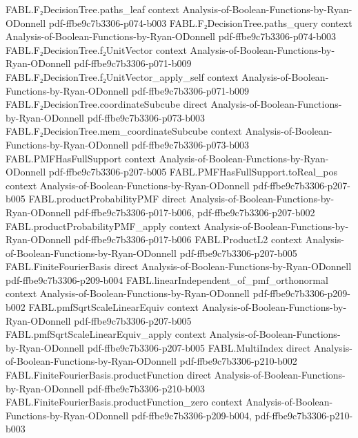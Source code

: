 \begin{theorem}
  {FABL.F₂DecisionTree.paths_leaf}
  {context}
  {Analysis-of-Boolean-Functions-by-Ryan-ODonnell}
  {pdf-ffbe9c7b3306-p074-b003}
\proofstep
  {FABL.F₂DecisionTree.paths_query}
  {context}
  {Analysis-of-Boolean-Functions-by-Ryan-ODonnell}
  {pdf-ffbe9c7b3306-p074-b003}
\proofstep
  {FABL.F₂DecisionTree.f₂UnitVector}
  {context}
  {Analysis-of-Boolean-Functions-by-Ryan-ODonnell}
  {pdf-ffbe9c7b3306-p071-b009}
\proofstep
  {FABL.F₂DecisionTree.f₂UnitVector_apply_self}
  {context}
  {Analysis-of-Boolean-Functions-by-Ryan-ODonnell}
  {pdf-ffbe9c7b3306-p071-b009}
\proofstep
  {FABL.F₂DecisionTree.coordinateSubcube}
  {direct}
  {Analysis-of-Boolean-Functions-by-Ryan-ODonnell}
  {pdf-ffbe9c7b3306-p073-b003}
\proofstep
  {FABL.F₂DecisionTree.mem_coordinateSubcube}
  {context}
  {Analysis-of-Boolean-Functions-by-Ryan-ODonnell}
  {pdf-ffbe9c7b3306-p073-b003}
\proofstep
  {FABL.PMFHasFullSupport}
  {context}
  {Analysis-of-Boolean-Functions-by-Ryan-ODonnell}
  {pdf-ffbe9c7b3306-p207-b005}
\proofstep
  {FABL.PMFHasFullSupport.toReal_pos}
  {context}
  {Analysis-of-Boolean-Functions-by-Ryan-ODonnell}
  {pdf-ffbe9c7b3306-p207-b005}
\proofstep
  {FABL.productProbabilityPMF}
  {direct}
  {Analysis-of-Boolean-Functions-by-Ryan-ODonnell}
  {pdf-ffbe9c7b3306-p017-b006,
    pdf-ffbe9c7b3306-p207-b002}
\proofstep
  {FABL.productProbabilityPMF_apply}
  {context}
  {Analysis-of-Boolean-Functions-by-Ryan-ODonnell}
  {pdf-ffbe9c7b3306-p017-b006}
\proofstep
  {FABL.ProductL2}
  {context}
  {Analysis-of-Boolean-Functions-by-Ryan-ODonnell}
  {pdf-ffbe9c7b3306-p207-b005}
\proofstep
  {FABL.FiniteFourierBasis}
  {direct}
  {Analysis-of-Boolean-Functions-by-Ryan-ODonnell}
  {pdf-ffbe9c7b3306-p209-b004}
\proofstep
  {FABL.linearIndependent_of_pmf_orthonormal}
  {context}
  {Analysis-of-Boolean-Functions-by-Ryan-ODonnell}
  {pdf-ffbe9c7b3306-p209-b002}
\proofstep
  {FABL.pmfSqrtScaleLinearEquiv}
  {context}
  {Analysis-of-Boolean-Functions-by-Ryan-ODonnell}
  {pdf-ffbe9c7b3306-p207-b005}
\proofstep
  {FABL.pmfSqrtScaleLinearEquiv_apply}
  {context}
  {Analysis-of-Boolean-Functions-by-Ryan-ODonnell}
  {pdf-ffbe9c7b3306-p207-b005}
\proofstep
  {FABL.MultiIndex}
  {direct}
  {Analysis-of-Boolean-Functions-by-Ryan-ODonnell}
  {pdf-ffbe9c7b3306-p210-b002}
\proofstep
  {FABL.FiniteFourierBasis.productFunction}
  {direct}
  {Analysis-of-Boolean-Functions-by-Ryan-ODonnell}
  {pdf-ffbe9c7b3306-p210-b003}
\proofstep
  {FABL.FiniteFourierBasis.productFunction_zero}
  {context}
  {Analysis-of-Boolean-Functions-by-Ryan-ODonnell}
  {pdf-ffbe9c7b3306-p209-b004,
    pdf-ffbe9c7b3306-p210-b003}
\proofstep

\end{theorem}
